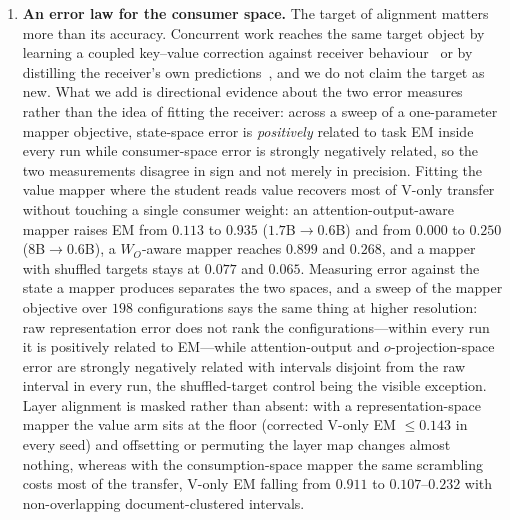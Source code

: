 \documentclass[11pt]{article}
\begin{document}
\begin{enumerate}
\item \textbf{An error law for the consumer space.} The target of alignment
  matters more than its accuracy. Concurrent work reaches the same target object
  by learning a coupled key--value correction against receiver
  behaviour~\cite{cachelink2026} or by distilling the receiver's own
  predictions~\cite{kvlingo2026}, and we do not claim the target as new. What we
  add is directional evidence about the two error measures rather than the idea of
  fitting the receiver: across a sweep of a one-parameter mapper objective,
  state-space error is \emph{positively} related to task EM inside every run while
  consumer-space error is strongly negatively related, so the two measurements
  disagree in sign and not merely in precision. Fitting the value
  mapper where the student reads value recovers most of V-only transfer without
  touching a single consumer weight: an attention-output-aware mapper raises EM
  from $0.113$ to $0.935$
  ($1.7$B$\to0.6$B) and from $0.000$ to $0.250$ ($8$B$\to0.6$B), a
  $W_O$-aware mapper reaches $0.899$ and $0.268$, and a mapper with shuffled
  targets stays at $0.077$ and $0.065$. Measuring error against the state a mapper
  produces separates the two spaces, and a sweep of the mapper objective over
  $198$ configurations says the same thing at higher resolution: raw
  representation error does not rank the configurations---within every run it is
  positively related to EM---while attention-output and $o$-projection-space error
  are strongly negatively related with intervals disjoint from the raw interval in
  every run, the shuffled-target control being the visible exception. Layer
  alignment is masked rather than absent: with a representation-space mapper the
  value arm sits at the floor (corrected V-only EM $\le0.143$ in every seed) and
  offsetting or permuting the layer map changes almost nothing, whereas with the
  consumption-space mapper the same scrambling costs most of the transfer,
  V-only EM falling from $0.911$ to $0.107$--$0.232$ with non-overlapping
  document-clustered intervals.


\end{enumerate}
\end{document}
